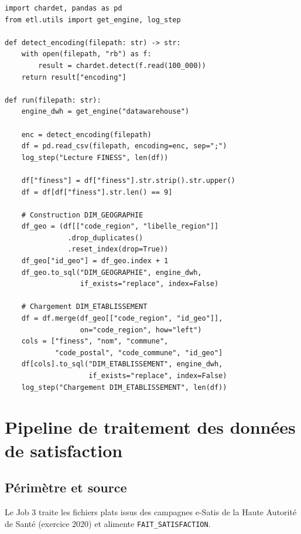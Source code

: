 \documentclass[12pt, a4paper]{report}
\begin{document}
\begin{itemize}[label=\textcolor{chuBlue}{\textbullet}]
\begin{lstlisting}[style=python, caption={Job 2 -- détection d'encodage et nettoyage FINESS}, label={lst:job2}]
import chardet, pandas as pd
from etl.utils import get_engine, log_step

def detect_encoding(filepath: str) -> str:
    with open(filepath, "rb") as f:
        result = chardet.detect(f.read(100_000))
    return result["encoding"]

def run(filepath: str):
    engine_dwh = get_engine("datawarehouse")

    enc = detect_encoding(filepath)
    df = pd.read_csv(filepath, encoding=enc, sep=";")
    log_step("Lecture FINESS", len(df))

    df["finess"] = df["finess"].str.strip().str.upper()
    df = df[df["finess"].str.len() == 9]

    # Construction DIM_GEOGRAPHIE
    df_geo = (df[["code_region", "libelle_region"]]
               .drop_duplicates()
               .reset_index(drop=True))
    df_geo["id_geo"] = df_geo.index + 1
    df_geo.to_sql("DIM_GEOGRAPHIE", engine_dwh,
                  if_exists="replace", index=False)

    # Chargement DIM_ETABLISSEMENT
    df = df.merge(df_geo[["code_region", "id_geo"]],
                  on="code_region", how="left")
    cols = ["finess", "nom", "commune",
            "code_postal", "code_commune", "id_geo"]
    df[cols].to_sql("DIM_ETABLISSEMENT", engine_dwh,
                    if_exists="replace", index=False)
    log_step("Chargement DIM_ETABLISSEMENT", len(df))
\end{lstlisting}


\section{Pipeline de traitement des données de satisfaction}
\label{sec:job3}

\subsection{Périmètre et source}

Le Job 3 traite les fichiers plats issus des campagnes e-Satis de la Haute Autorité de Santé (exercice 2020) et alimente \texttt{FAIT\_SATISFACTION}.


\end{itemize}
\end{document}
